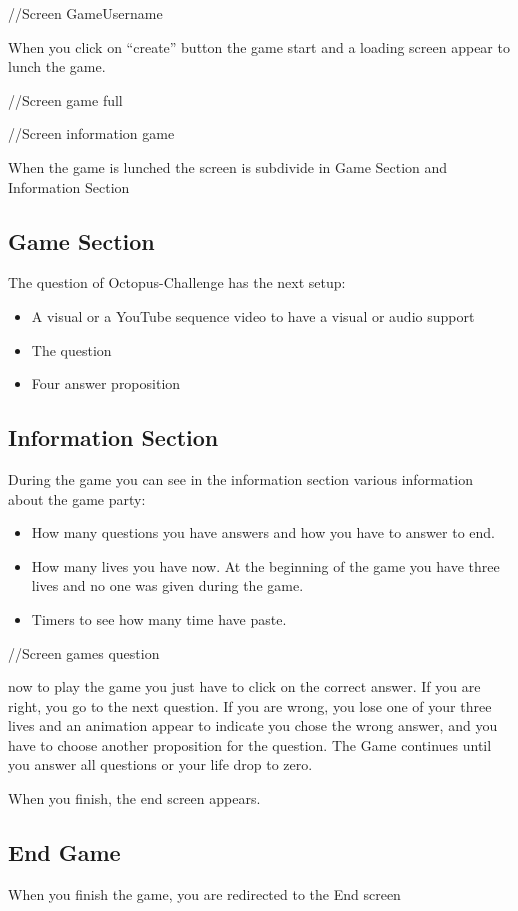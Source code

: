 \documentclass[a4paper,11pt, oneside]{book}
\begin{document}
//Screen GameUsername

When you click on “create” button the game start and a loading screen appear to lunch the game.

//Screen game full


//Screen information game

When the game is lunched the screen is subdivide in Game Section and Information Section
\subsection{Game Section}
 The question of Octopus-Challenge has the next setup:
 	\begin{itemize}
		\item A visual or a YouTube sequence video to have a visual or audio support
		\item The question
		\item Four answer proposition
	\end{itemize}

\subsection{Information Section}
	During the game you can see in the information section various information about the game party:
	\begin{itemize}
	\item How many questions you have answers and how you have to answer to end.
	\item How many lives you have now. At the beginning of the game you have three lives and no one was given during the game.
	\item Timers to see how many time have paste.
	\end{itemize}


//Screen games question

now to play the game you just have to click on the correct answer.
If you are right, you go to the next question.
If you are wrong, you lose one of your three lives and an animation appear to indicate you chose the wrong answer, and you have to choose another proposition for the question.
The Game continues until you answer all questions or your life drop to zero.

When you finish, the end screen appears.

\subsection{End Game}
	When you finish the game, you are redirected to the End screen
\end{document}
